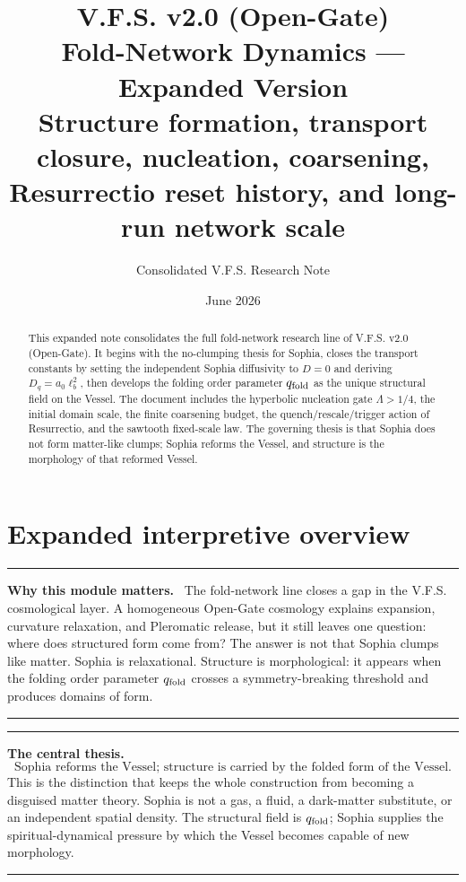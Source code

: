 \documentclass[11pt,a4paper]{article}
\title{\textbf{V.F.S. v2.0 (Open-Gate)}\\Fold-Network Dynamics --- Expanded Version\\
\large Structure formation, transport closure, nucleation, coarsening, Resurrectio reset history, and long-run network scale}
\author{Consolidated V.F.S. Research Note}
\date{June 2026}
\newcommand{\qf}{q_{\rm fold}}
\newcommand{\Dq}{D_q}
\newenvironment{commentbox}[1]{\begin{center}\begin{minipage}{0.90\textwidth}\hrule\vspace{0.45em}\textbf{#1.}\ }{\vspace{0.45em}\hrule\end{minipage}\end{center}}
\theoremstyle{plain}
\theoremstyle{definition}
\theoremstyle{remark}
\begin{document}
\maketitle

\begin{abstract}
This expanded note consolidates the full fold-network research line of V.F.S. v2.0 (Open-Gate).  It begins with the no-clumping thesis for Sophia, closes the transport constants by setting the independent Sophia diffusivity to $D=0$ and deriving $\Dq=a_0\ell_b^2$, then develops the folding order parameter $\qf$ as the unique structural field on the Vessel.  The document includes the hyperbolic nucleation gate $\Lambda>1/4$, the initial domain scale, the finite coarsening budget, the quench/rescale/trigger action of Resurrectio, and the sawtooth fixed-scale law.  The governing thesis is that Sophia does not form matter-like clumps; Sophia reforms the Vessel, and structure is the morphology of that reformed Vessel.
\end{abstract}

\tableofcontents
\newpage

\section{Expanded interpretive overview}
\begin{commentbox}{Why this module matters}
The fold-network line closes a gap in the V.F.S. cosmological layer.  A homogeneous Open-Gate cosmology explains expansion, curvature relaxation, and Pleromatic release, but it still leaves one question: where does structured form come from?  The answer is not that Sophia clumps like matter.  Sophia is relaxational.  Structure is morphological: it appears when the folding order parameter $\qf$ crosses a symmetry-breaking threshold and produces domains of form.
\end{commentbox}

\begin{commentbox}{The central thesis}
\[
\boxed{\text{Sophia reforms the Vessel; structure is carried by the folded form of the Vessel.}}
\]
This is the distinction that keeps the whole construction from becoming a disguised matter theory.  Sophia is not a gas, a fluid, a dark-matter substitute, or an independent spatial density.  The structural field is $\qf$; Sophia supplies the spiritual-dynamical pressure by which the Vessel becomes capable of new morphology.
\end{commentbox}
\end{document}
